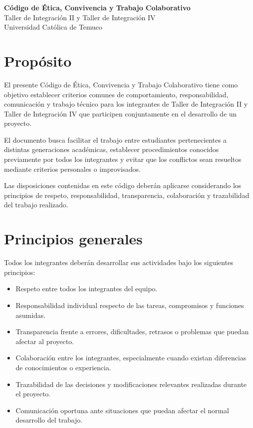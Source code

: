 \documentclass[12pt,a4paper]{article}
\begin{document}
\begin{center}
    {\LARGE \textbf{Código de Ética, Convivencia y Trabajo Colaborativo}}\\[0.4cm]
    {\large Taller de Integración II y Taller de Integración IV}\\[0.3cm]
    Universidad Católica de Temuco
\end{center}

\vspace{0.5cm}

\section{Propósito}

El presente Código de Ética, Convivencia y Trabajo Colaborativo tiene como objetivo establecer criterios comunes de comportamiento, responsabilidad, comunicación y trabajo técnico para los integrantes de Taller de Integración II y Taller de Integración IV que participen conjuntamente en el desarrollo de un proyecto.

El documento busca facilitar el trabajo entre estudiantes pertenecientes a distintas generaciones académicas, establecer procedimientos conocidos previamente por todos los integrantes y evitar que los conflictos sean resueltos mediante criterios personales o improvisados.

Las disposiciones contenidas en este código deberán aplicarse considerando los principios de respeto, responsabilidad, transparencia, colaboración y trazabilidad del trabajo realizado.

\section{Principios generales}

Todos los integrantes deberán desarrollar sus actividades bajo los siguientes principios:

\begin{itemize}
    \item Respeto entre todos los integrantes del equipo.

    \item Responsabilidad individual respecto de las tareas, compromisos y funciones asumidas.

    \item Transparencia frente a errores, dificultades, retrasos o problemas que puedan afectar al proyecto.

    \item Colaboración entre los integrantes, especialmente cuando existan diferencias de conocimientos o experiencia.

    \item Trazabilidad de las decisiones y modificaciones relevantes realizadas durante el proyecto.

    \item Comunicación oportuna ante situaciones que puedan afectar el normal desarrollo del trabajo.
\end{itemize}
\end{document}
